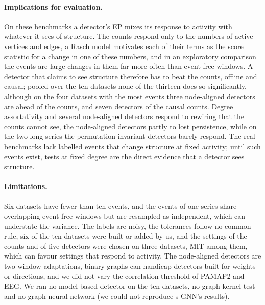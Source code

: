 \documentclass[11pt]{article}
\theoremstyle{dsplain}
\theoremstyle{definition}
\begin{document}
\paragraph{Implications for evaluation.} On these benchmarks a detector's EP mixes its response to
activity with whatever it sees of structure. The counts respond only to the numbers of active vertices and
edges, a Rasch model motivates each of their terms as the score statistic for a change in one of these
numbers, and in an
exploratory comparison the events are large changes in them far more often than event-free windows. A
detector that claims to see structure therefore has to beat the counts, offline and causal; pooled over the
ten datasets none of the thirteen does so significantly, although on the four datasets with the most events
three node-aligned detectors are ahead of the counts, and seven detectors of the causal counts. Degree assortativity and several node-aligned detectors respond to rewiring that the counts cannot see,
the node-aligned detectors partly to lost persistence, while on the two long series the
permutation-invariant detectors barely respond. The real benchmarks lack labelled events that change
structure at fixed activity; until such events exist, tests at fixed degree are the direct evidence that a
detector sees structure.

\paragraph{Limitations.}\label{sec:limits} Six datasets have fewer than ten events, and the events of one
series share overlapping event-free windows but are resampled as independent, which can understate the
variance. The labels are noisy, the tolerances follow no common rule, six of the ten datasets were built or
added by us, and the settings of the counts and of five detectors were chosen on three datasets, MIT among them, which can favour settings that respond to activity. The node-aligned
detectors are two-window adaptations, binary graphs can handicap detectors built for weights or
directions, and we did not vary the correlation threshold of PAMAP2 and EEG. We ran no model-based detector
on the ten datasets, no graph-kernel test and no graph neural network (we could not reproduce s-GNN's results).
\end{document}
